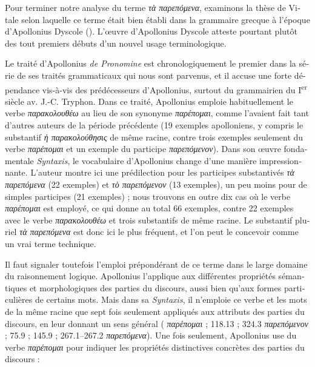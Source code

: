 \documentclass[french,output=paper,colorlinks,citecolor=brown]{../langscibook}
\begin{document}
\begin{otherlanguage}{french}
Pour terminer notre analyse du terme \textit{τὰ παρεπόμενα}, examinons la thèse de Vitale selon laquelle ce terme était bien établi dans la grammaire grecque à l’époque d’Apollonius Dyscole (\citealt[212]{Vitale1982}). L’œuvre d’Apollonius Dyscole atteste pourtant plutôt des tout premiers débuts d’un nouvel usage terminologique. 

Le traité d’Apollonius \textit{de Pronomine} est chronologiquement le premier dans la série de ses traités grammaticaux qui nous sont parvenus, et il accuse une forte dépendance vis-à-vis des prédécesseurs d’Apollonius, surtout du grammairien du I\textsuperscript{er} siècle av. J.-C. Tryphon. Dans ce traité, Apollonius emploie habituellement le verbe \textit{παρακολουθέω} au lieu de son synonyme \textit{παρέπομαι}, comme l’avaient fait tant d’autres auteurs de la période précédente (19 exemples apolloniens, y compris le substantif \textit{ἡ παρακολούθησις} de même racine, contre trois exemples seulement du verbe \textit{παρέπομαι} et un exemple du participe \textit{παρεπόμενον}). Dans son œuvre fondamentale \textit{Syntaxis}, le vocabulaire d’Apollonius change d’une manière impressionnante. L’auteur montre ici une prédilection pour les participes substantivés \textit{τὰ παρεπόμενα} (22 exemples) et \textit{τὸ παρεπόμενον} (13 exemples), un peu moins pour de simples participes (21 exemples) ; nous trouvons en outre dix cas où le verbe \textit{παρέπομαι} est employé, ce qui donne au total 66 exemples, contre 22 exemples avec le verbe \textit{παρακολουθέω} et trois substantifs de même racine. Le substantif pluriel \textit{τὰ παρεπόμενα} est donc ici le plus fréquent, et l’on peut le concevoir comme un vrai terme technique. 

Il faut signaler toutefois l’emploi prépondérant de ce terme dans le large domaine du raisonnement logique. Apollonius l’applique aux différentes propriétés sémantiques et morphologiques des parties du discours, aussi bien qu’aux formes particulières de certains mots. Mais dans sa \textit{Syntaxis}, il n’emploie ce verbe et les mots de la même racine que sept fois seulement appliqués aux attributs des parties du discours, en leur donnant un sens général ( \textit{παρέπομαι} ; 118.13 ; 324.3 \textit{παρεπόμενον} ; 75.9 ; 145.9 ; 267.1--267.2 \textit{παρεπόμενα}). Une fois seulement, Apollonius use du verbe \textit{παρέπομαι} pour indiquer les propriétés distinctives concrètes des parties du discours :


\end{otherlanguage}
\end{document}
